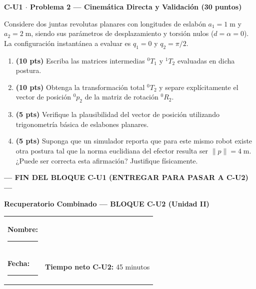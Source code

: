 \documentclass[11pt, a4paper]{article}
\begin{document}
\vspace{0.4cm}
\noindent\textbf{\large C-U1 $\cdot$ Problema 2 — Cinemática Directa y Validación (30 puntos)}

Considere dos juntas revolutas planares con longitudes de eslabón $a_1=1\;\mathrm{m}$ y $a_2=2\;\mathrm{m}$, siendo sus parámetros de desplazamiento y torsión nulos ($d=\alpha=0$). La configuración instantánea a evaluar es $q_1=0$ y $q_2=\pi/2$.

\begin{enumerate}
    \item \textbf{(10 pts)} Escriba las matrices intermedias ${}^0T_1$ y ${}^1T_2$ evaluadas en dicha postura.
    \item \textbf{(10 pts)} Obtenga la transformación total ${}^0T_2$ y separe explícitamente el vector de posición ${}^0p_2$ de la matriz de rotación ${}^0R_2$.
    \item \textbf{(5 pts)} Verifique la plausibilidad del vector de posición utilizando trigonometría básica de eslabones planares.
    \item \textbf{(5 pts)} Suponga que un simulador reporta que para este mismo robot existe otra postura tal que la norma euclidiana del efector resulta ser $\|p\| = 4\;\mathrm{m}$. ¿Puede ser correcta esta afirmación? Justifique físicamente.
\end{enumerate}

\begin{center}
    \textbf{--- FIN DEL BLOQUE C-U1 (ENTREGAR PARA PASAR A C-U2) ---}
\end{center}

\newpage
\setcounter{page}{1}

\begin{center}
    \Large\textbf{\textcolor{ucbblue}{Recuperatorio Combinado — BLOQUE C-U2 (Unidad II)}}
\end{center}

\vspace{0.2cm}
\noindent\begin{tabular}{ll}
\textbf{Nombre:} \rule{7cm}{0.15mm} \\
\textbf{Fecha:} \rule{4cm}{0.15mm} & \textbf{Tiempo neto C-U2:} 45 minutos
\end{tabular}
\end{document}
